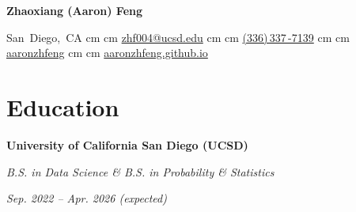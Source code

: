 \documentclass[10pt, letterpaper]{article}
\newenvironment{twocolentry}[2][]{
    \onecolentry
    \def\secondColumn{#2}
    \setcolumnwidth{\fill, 4.5 cm}
    \begin{paracol}{2}
}{
    \switchcolumn \raggedleft \secondColumn
    \end{paracol}
    \endonecolentry
}
\newenvironment{header}{
    \setlength{\topsep}{0pt}\par\kern\topsep\centering\linespread{1.5}
}{
    \par\kern\topsep
}
\newcommand{\AND}{\unskip\enspace\textbar\enspace}
\let\hrefWithoutArrow\href
\renewcommand{\href}[2]{\hrefWithoutArrow{#1}{\ifthenelse{\equal{#2}{}}{ }{#2}}}
\begin{document}
    \begin{header}
        \textbf{\fontsize{24 pt}{24 pt}\selectfont Zhaoxiang (Aaron) Feng}

        \vspace{0.3 cm}

        \normalsize
        \mbox{{\color{black}\footnotesize\faMapMarker*}\hspace*{0.13cm}San Diego, CA}%
         cm%
        \AND%
         cm%
        \mbox{\hrefWithoutArrow{mailto:zhf004@ucsd.edu}{\color{black}{\footnotesize\faEnvelope[regular]}\hspace*{0.13cm}zhf004@ucsd.edu}}%
         cm%
        \AND%
         cm%
        \mbox{\hrefWithoutArrow{tel:+13363377139}{\color{black}{\footnotesize\faPhone*}\hspace*{0.13cm}(336)\,337\,-7139}}%
         cm%
        \AND%
         cm%
        \mbox{\hrefWithoutArrow{https://github.com/aaronzhfeng}{\color{black}{\footnotesize\faGithub}\hspace*{0.13cm}aaronzhfeng}}%
         cm%
        \AND%
         cm%
        \mbox{\hrefWithoutArrow{https://aaronzhfeng.github.io/}{\color{black}{\footnotesize\faGlobe}\hspace*{0.13cm}aaronzhfeng.github.io}}%

    \end{header}

    \vspace{0.3 cm - 0.3 cm}

    \section{Education}

    \begin{twocolentry}{\textit{Sep. 2022 -- Apr. 2026 (expected)}}
        \textbf{University of California San Diego (UCSD)}

        \textit{B.S. in Data Science \& B.S. in Probability \& Statistics}
    \end{twocolentry}
\end{document}
